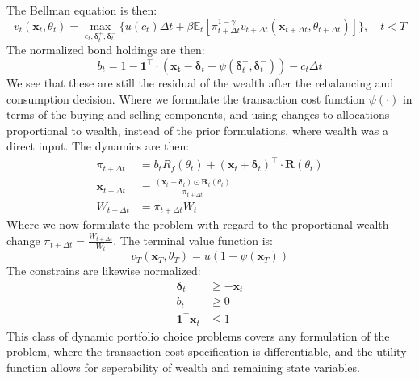\documentclass[11pt]{article}
\begin{document}
The Bellman equation is then:
\begin{equation} \label{eq: class_bellman}
  v_{t} (\mathbf{x}_{t}, \theta_t) = \max_{c_t , \boldsymbol{\delta}^{+}_{t}, \boldsymbol{\delta}^{-}_{t} } \{ u(c_t) 
  \Delta t + \beta \mathbb{E}_{t} \left[ 
    \pi_{t+\Delta t}^{1-\gamma}
    v_{t+\Delta t} (\mathbf{x}_{t+\Delta t }, \theta_{t + \Delta t }  ) 
    \right] \} , \quad t < T 
\end{equation}
The normalized bond holdings are then:
\begin{equation}\label{eq: class_bond_holdings}
  b_{t} = 1 - \mathbf{1}^{\top} \cdot (\mathbf{x_t} - \boldsymbol{\delta}_t - \psi( \boldsymbol{\delta}^{+}_{t}, \boldsymbol{\delta}^{-}_{t}  )) - c_t \Delta t
\end{equation}
We see that these are still the residual of the wealth after the rebalancing and consumption decision.
Where we formulate the transaction cost function $\psi(\cdot)$ in terms of the buying and selling components,
and using changes to allocations proportional to wealth, instead of the prior formulations, where wealth was a direct input.
The dynamics are then:
\begin{align}
  \pi_{t+\Delta t} &= b_t R_f (\theta_t)  + (\mathbf{x}_t + \boldsymbol{\delta}_t)^{\top} \cdot \mathbf{R}(\theta_t) \\
  \mathbf{x}_{t+\Delta t} &=  \frac{(\mathbf{x}_t + \boldsymbol{\delta}_t) \odot \mathbf{R}_t (\theta_t )}{ \pi_{t+\Delta t} } \\
  W_{t+\Delta t} &= \pi_{t+\Delta t} W_t
\end{align}
Where we now formulate the problem with regard to the proportional wealth change $\pi_{t+\Delta t} = \frac{W_{t+\Delta t}}{W_t}$.
The terminal value function is:
\begin{equation} \label{eq: class_terminal_value}
  v_T (\mathbf{x}_T , \theta_T ) = u (1 - \psi(\mathbf{x}_T)) 
\end{equation}
The constrains are likewise normalized:
\begin{align}
  \boldsymbol{\delta}_t &\geq - \mathbf{x}_t \label{eq: No_Short_risky} \\
  b_t &\geq 0 \label{eq: No_Short_bonds}\\
  \mathbf{1}^{\top} \mathbf{x}_t &\leq 1 \label{eq: No_Geared_Risky}
\end{align}
This class of dynamic portfolio choice problems covers any formulation of the problem,
where the transaction cost specification is differentiable, and the utility function allows for seperability of wealth and remaining state variables.
\end{document}
